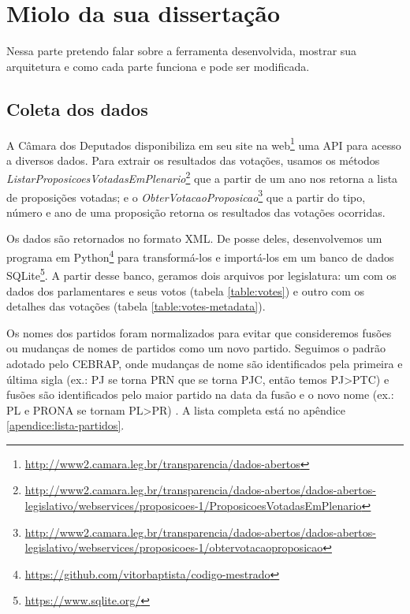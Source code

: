

\chapter{Miolo da sua dissertação}\label{cap:miolo}

Nessa parte pretendo falar sobre a ferramenta desenvolvida, mostrar sua arquitetura e como cada parte funciona e pode ser modificada.

\section{Coleta dos dados}

A Câmara dos Deputados disponibiliza em seu site na
web\footnote{\url{http://www2.camara.leg.br/transparencia/dados-abertos}} uma
\gls{API} para acesso a diversos dados. Para extrair os resultados das
votações, usamos os métodos
\emph{ListarProposicoesVotadasEmPlenario}\footnote{\url{http://www2.camara.leg.br/transparencia/dados-abertos/dados-abertos-legislativo/webservices/proposicoes-1/ProposicoesVotadasEmPlenario}}
que a partir de um ano nos retorna a lista de proposições votadas; e o
\emph{ObterVotacaoProposicao}\footnote{\url{http://www2.camara.leg.br/transparencia/dados-abertos/dados-abertos-legislativo/webservices/proposicoes-1/obtervotacaoproposicao}}
que a partir do tipo, número e ano de uma proposição retorna os resultados das
votações ocorridas.  

Os dados são retornados no formato \gls{XML}. De posse deles, desenvolvemos um
programa em
Python\footnote{\url{https://github.com/vitorbaptista/codigo-mestrado}} para
transformá-los e importá-los em um banco de dados
SQLite\footnote{\url{https://www.sqlite.org/}}. A partir desse banco, geramos
dois arquivos por legislatura: um com os dados dos parlamentares e seus votos
(tabela \ref{table:votes}) e outro com os detalhes das votações (tabela
\ref{table:votes-metadata}).

Os nomes dos partidos foram normalizados para evitar que consideremos fusões ou
mudanças de nomes de partidos como um novo partido. Seguimos o padrão adotado
pelo \gls{CEBRAP}, onde mudanças de nome são identificados pela primeira e
última sigla (ex.: PJ se torna PRN que se torna PJC, então temos PJ>PTC) e
fusões são identificados pelo maior partido na data da fusão e o novo nome
(ex.: PL e PRONA se tornam PL>PR) \cite{Freitas2008}. A lista completa está no
apêndice \ref{apendice:lista-partidos}.

